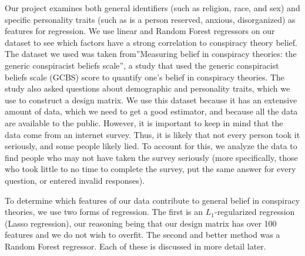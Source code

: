 \documentclass{article}[11pt]
\begin{document}
Our project examines both general identifiers (such as religion,
race, and sex) and specific personality traits (such as is a person
reserved, anxious, disorganized) as features for regression. We use linear and Random Forest regressors on our dataset to see which factors have a
strong correlation to conspiracy theory belief. The dataset we used was
taken from''Measuring belief in conspiracy theories: the generic
conspiracist beliefs scale'', a study that used the generic
conspiracist beliefs scale (GCBS) score to quantify one's belief in
conspiracy theories. The study also asked questions about demographic
and personality traits, which we use to construct a design matrix. We
use this dataset because it has an extensive amount of data, which we
need to get a good estimator, and because all the data are available
to the public. However, it is important to keep in mind that the data
come from an internet survey. Thus, it is likely that not every person
took it seriously, and some people likely lied. To account for this, we
analyze the data to find people who may not have taken the survey
seriously (more specifically, those who took little to no time to complete the survey, put the same
answer for every question, or entered invalid responses). 

To determine which features of our data contribute to general belief in conspiracy theories, we use two forms of regression. The first is an $L_1$-regularized regression (Lasso regression), our reasoning being that our design matrix has over 100 features and we do not wish to overfit. The second and better method was a Random Forest regressor. Each of these is discussed in more detail later. 
\end{document}
